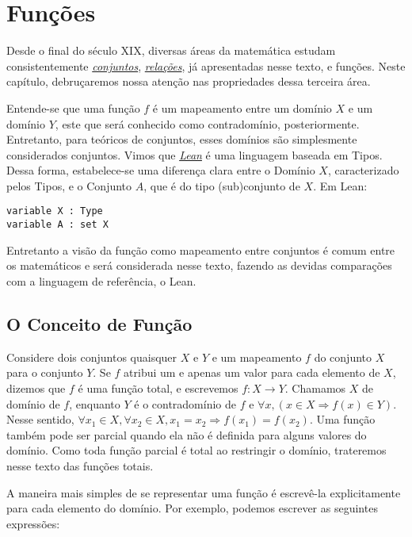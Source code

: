 \chapter{Funções}

Desde o final do século XIX, diversas áreas da matemática 
estudam consistentemente \textit{\hyperlink{chapter.4}{conjuntos}}, 
\textit{\hyperlink{chapter.5}{relações}}, já apresentadas 
nesse texto, e funções. Neste capítulo, debruçaremos nossa 
atenção nas propriedades dessa terceira área. 

Entende-se que uma função $f$ é um mapeamento entre um 
domínio $X$ e um domínio $Y$, este que será conhecido como 
contradomínio, posteriormente. Entretanto, para teóricos 
de conjuntos, esses domínios são simplesmente considerados 
conjuntos. Vimos que \textit{\hyperlink{chapter.2}{Lean}} é uma 
linguagem baseada em Tipos. Dessa forma, estabelece-se uma 
diferença clara entre o Domínio $X$, caracterizado pelos Tipos, e
o Conjunto $A$, que é do tipo (sub)conjunto de $X$. Em Lean: 
\begin{lstlisting}
variable X : Type
variable A : set X    
\end{lstlisting}

Entretanto a visão da função como mapeamento entre conjuntos
é comum entre os matemáticos e será considerada nesse texto,
fazendo as devidas comparações com a linguagem de referência, 
o Lean. 

\section{O Conceito de Função}

Considere dois conjuntos quaisquer $X$ e $Y$ e um mapeamento $f$ 
do conjunto $X$ para o conjunto $Y$. Se $f$ atribui um e apenas 
um valor para cada elemento de $X$, dizemos que $f$ é uma função total, e
escrevemos $f: X \to Y$.  Chamamos $X$ de domínio de $f$, enquanto 
$Y$ é o contradomínio de $f$ e $\forall x, (x \in X  \Rightarrow f(x) \in Y)$. 
Nesse sentido, $\forall x_1 \in X, \forall x_2 \in X, x_1 = x_2 \Rightarrow f(x_1) = f(x_2)$.
Uma função também pode ser parcial quando ela não é definida para alguns valores 
do domínio. Como toda função parcial é total ao restringir o domínio, trateremos 
nesse texto das funções totais. 

A maneira mais simples de se representar uma função é escrevê-la explicitamente 
para cada elemento do domínio. Por exemplo, podemos escrever as seguintes expressões:

